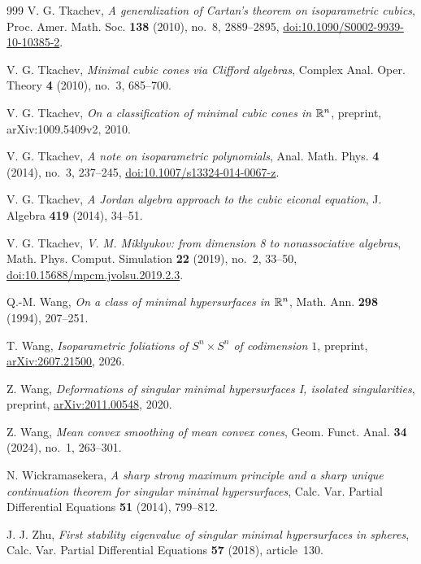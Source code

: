 \begin{thebibliography}{999}
V. G. Tkachev,
\emph{A generalization of Cartan's theorem on isoparametric cubics},
Proc. Amer. Math. Soc. \textbf{138} (2010), no.~8, 2889--2895,
\href{https://doi.org/10.1090/S0002-9939-10-10385-2}{doi:10.1090/S0002-9939-10-10385-2}.

V. G. Tkachev,
\emph{Minimal cubic cones via Clifford algebras},
Complex Anal. Oper. Theory \textbf{4} (2010), no.~3, 685--700.

V. G. Tkachev,
\emph{On a classification of minimal cubic cones in \(\mathbb R^n\)},
preprint, arXiv:\allowbreak 1009.5409v2, 2010.

V. G. Tkachev,
\emph{A note on isoparametric polynomials},
Anal. Math. Phys. \textbf{4} (2014), no.~3, 237--245,
\href{https://doi.org/10.1007/s13324-014-0067-z}{doi:10.1007/s13324-014-0067-z}.

V. G. Tkachev,
\emph{A Jordan algebra approach to the cubic eiconal equation},
J. Algebra \textbf{419} (2014), 34--51.

V. G. Tkachev,
\emph{V. M. Miklyukov: from dimension 8 to nonassociative algebras},
Math. Phys. Comput. Simulation \textbf{22} (2019), no.~2, 33--50,
\href{https://doi.org/10.15688/mpcm.jvolsu.2019.2.3}{doi:10.15688/mpcm.jvolsu.2019.2.3}.

Q.-M. Wang,
\emph{On a class of minimal hypersurfaces in \(\mathbb R^n\)},
Math. Ann. \textbf{298} (1994), 207--251.

T. Wang,
\emph{Isoparametric foliations of \(S^n\times S^n\) of codimension \(1\)},
preprint, \href{https://arxiv.org/abs/2607.21500}{arXiv:2607.21500}, 2026.

Z. Wang,
\emph{Deformations of singular minimal hypersurfaces I, isolated singularities},
preprint, \href{https://arxiv.org/abs/2011.00548}{arXiv:2011.00548}, 2020.

Z. Wang,
\emph{Mean convex smoothing of mean convex cones},
Geom. Funct. Anal. \textbf{34} (2024), no.~1, 263--301.

N. Wickramasekera,
\emph{A sharp strong maximum principle and a sharp unique continuation
theorem for singular minimal hypersurfaces},
Calc. Var. Partial Differential Equations \textbf{51} (2014), 799--812.

J. J. Zhu,
\emph{First stability eigenvalue of singular minimal hypersurfaces
in spheres},
Calc. Var. Partial Differential Equations \textbf{57} (2018),
article~130.

\end{thebibliography}


